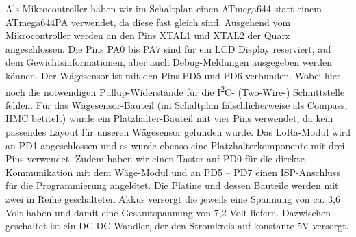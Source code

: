 Als Mikrocontroller haben wir im Schaltplan einen ATmega644 statt einem ATmega644PA verwendet, da diese fast gleich sind. Ausgehend vom Mikrocontroller werden an den Pins XTAL1 und XTAL2 der Quarz angeschlossen. Die Pins PA0 bis PA7 sind für ein LCD Display reserviert, auf dem Gewichtsinformationen, aber auch Debug-Meldungen ausgegeben werden können. Der Wägesensor ist mit den Pins PD5 und PD6 verbunden. Wobei hier noch die notwendigen Pullup-Widerstände für die I\textsuperscript{2}C- (Two-Wire-) Schnittstelle fehlen. Für das Wägesensor-Bauteil (im Schaltplan fälschlicherweise als Compass, HMC betitelt) wurde ein Platzhalter-Bauteil mit vier Pins verwendet, da kein passendes Layout für unseren Wägesensor gefunden wurde. Das LoRa-Modul wird an PD1 angeschlossen und es wurde ebenso eine Platzhalterkomponente mit drei Pins verwendet. Zudem haben wir einen Taster auf PD0 für die direkte Kommunikation mit dem Wäge-Modul und an PD5 – PD7 einen ISP-Anschluss für die Programmierung angelötet. Die Platine und dessen Bauteile werden mit zwei in Reihe geschalteten Akkus versorgt die jeweils eine Spannung von ca. 3,6 Volt haben und damit eine Gesamtspannung von 7,2 Volt liefern. Dazwischen geschaltet ist ein DC-DC Wandler, der den Stromkreis auf konstante 5V versorgt.\\

